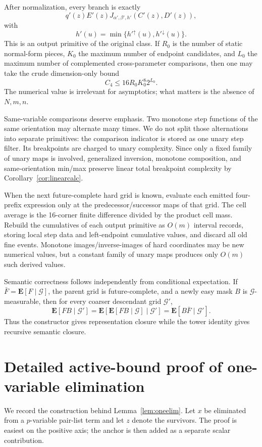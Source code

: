 \documentclass[12pt,a4paper]{article}
\theoremstyle{definition}
\newcommand{\E}{\mathbf E}
\newcommand{\1}{\mathbf 1}
\begin{document}
After normalization, every branch is exactly
\[
q'(z)E'(z)
J_{\alpha',\beta',h'}(C'(z),D'(z)),
\]
with
\[
h'(u)=\min\{h'^{\uparrow}(u),h'^{\downarrow}(u)\}.
\]
This is an output primitive of the original class.  If $R_0$ is the number of static normal-form pieces, $K_0$ the maximum number of endpoint candidates, and $L_0$ the maximum number of complemented cross-parameter comparisons, then one may take the crude dimension-only bound
\[
C_4\le 16R_0K_0^8 2^{L_0}.
\]
The numerical value is irrelevant for asymptotics; what matters is the absence of $N,m,n$.

Same-variable comparisons deserve emphasis.  Two monotone step functions of the same orientation may alternate many times.  We do not split those alternations into separate primitives: the comparison indicator is stored as one unary step filter.  Its breakpoints are charged to unary complexity.  Since only a fixed family of unary maps is involved, generalized inversion, monotone composition, and same-orientation min/max preserve linear total breakpoint complexity by Corollary~\ref{cor:linearcalc}.

When the next future-complete hard grid is known, evaluate each emitted four-prefix expression only at the predecessor/successor maps of that grid.  The cell average is the 16-corner finite difference divided by the product cell mass.  Rebuild the cumulatives of each output primitive as $O(m)$ interval records, storing local step data and left-endpoint cumulative values, and discard all old fine events.  Monotone images/inverse-images of hard coordinates may be new numerical values, but a constant family of unary maps produces only $O(m)$ such derived values.

Semantic correctness follows independently from conditional expectation.  If $\bar F=\E[F\mid\mathcal G]$, the parent grid is future-complete, and a newly easy mask $B$ is $\mathcal G$-measurable, then for every coarser descendant grid $\mathcal G'$,
\[
\E[FB\mid\mathcal G']
=\E[\E[FB\mid\mathcal G]\mid\mathcal G']
=\E[B\bar F\mid\mathcal G'].
\]
Thus the constructor gives representation closure while the tower identity gives recursive semantic closure.


\section{Detailed active-bound proof of one-variable elimination}        \label{app:pairelim}

We record the construction behind Lemma~\ref{lem:oneelim}. Let $x$ be eliminated from a $p$-variable pair-list term and let $z$ denote the survivors. The proof is easiest on the positive axis; the anchor is then added as a separate scalar contribution.
\end{document}
